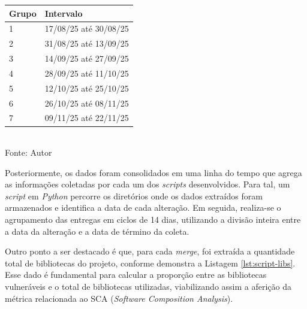 \begin{quadro}[h]
    \centering
    \caption{Períodos Analisados}
    \begin{tabular}{|p{2cm}|p{5cm}|}
        \hline
        \textbf{Grupo} & \textbf{Intervalo} \\
        \hline
        1 & 17/08/25 até 30/08/25 \\
        \hline
        2 & 31/08/25 até 13/09/25 \\
        \hline
        3 & 14/09/25 até 27/09/25 \\
        \hline
        4 & 28/09/25 até 11/10/25 \\
        \hline
        5 & 12/10/25 até 25/10/25 \\
        \hline
        6 & 26/10/25 até 08/11/25 \\
        \hline
        7 & 09/11/25 até 22/11/25 \\
        \hline
    \end{tabular} \\[0.5em]
    \label{tab:periodos-analisados}
    \small Fonte: Autor
\end{quadro}

Posteriormente, os dados foram consolidados em uma linha do tempo que agrega as informações coletadas por cada um dos \textit{scripts} desenvolvidos. Para tal, um \textit{script} em \textit{Python} percorre os diretórios onde os dados extraídos foram armazenados e identifica a data de cada alteração. Em seguida, realiza-se o agrupamento das entregas em ciclos de 14 dias, utilizando a divisão inteira entre a data da alteração e a data de término da coleta.

Outro ponto a ser destacado é que, para cada \textit{merge}, foi extraída a quantidade total de bibliotecas do projeto, conforme demonstra a Listagem \ref{lst:script-libs}. Esse dado é fundamental para calcular a proporção entre as bibliotecas vulneráveis e o total de bibliotecas utilizadas, viabilizando assim a aferição da métrica relacionada ao SCA (\textit{Software Composition Analysis}).


